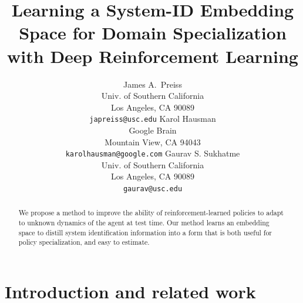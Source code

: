\documentclass{article}
\title{Learning a System-ID Embedding Space for Domain Specialization with Deep Reinforcement Learning}
\author{
  James A.~Preiss \\
  Univ. of Southern California\\
  Los Angeles, CA 90089\\
  \texttt{japreiss@usc.edu}
  \And
  Karol Hausman \\
  Google Brain \\
  Mountain View, CA 94043 \\
  \texttt{karolhausman@google.com}
  \And
  Gaurav S. Sukhatme \\
  Univ. of Southern California\\
  Los Angeles, CA 90089\\
  \texttt{gaurav@usc.edu}
}
\newcommand{\sysid}{dynamics}
\begin{document}
\maketitle

\begin{abstract}
\vspace{-0.1cm}
We propose a method to improve the ability of reinforcement-learned policies to adapt to unknown dynamics of the agent at test time.
Our method learns an embedding space
to distill system identification information into a form that is both useful for policy specialization, and easy to estimate.
\end{abstract}

\vspace{-0.3cm}
\section{Introduction and related work}
\vspace{-0.2cm}
\end{document}
